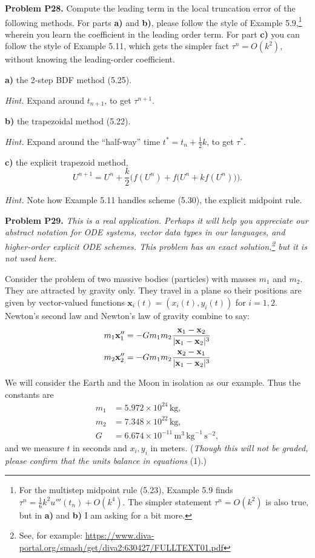 \documentclass[12pt]{amsart}
\newcommand{\bx}{\mathbf{x}}
\newcommand{\prob}[1]{\bigskip\noindent\textbf{#1}\quad }
\newcommand{\epart}[1]{\medskip\noindent\textbf{#1)}\quad }
\begin{document}
\prob{Problem P28.}  Compute the leading term in the local truncation error of the following methods.  For parts \textbf{a)} and \textbf{b)}, please follow the style of Example 5.9,\footnote{For the multistep midpoint rule (5.23), Example 5.9 finds $\tau^n = \frac{1}{6} k^2 u'''(t_n) + O(k^4)$.  The simpler statement $\tau^n=O(k^2)$ is also true, but in \textbf{a)} and \textbf{b)} I am asking for a bit more.} wherein you learn the coefficient in the leading order term.  For part \textbf{c)} you can follow the style of Example 5.11, which gets the simpler fact $\tau^n=O(k^2)$, without knowing the leading-order coefficient.

\epart{a} the 2-step BDF method (5.25).

\medskip
\noindent \emph{Hint.}  Expand around $t_{n+1}$, to get $\tau^{n+1}$.

\epart{b} the trapezoidal method (5.22).

\medskip
\noindent \emph{Hint.}  Expand around the ``half-way'' time $t^* = t_n+\frac{1}{2}k$, to get $\tau^*$.

\epart{c} the explicit trapezoid method,
    $$U^{n+1} = U^n + \frac{k}{2} \Big(f(U^n) + f\big(U^n + k f(U^n)\big)\Big).$$

\medskip
\noindent \emph{Hint.}  Note how Example 5.11 handles scheme (5.30), the explicit midpoint rule.


\prob{Problem P29.}  \emph{This is a real application.  Perhaps it will help you appreciate our abstract notation for ODE systems, vector data types in our languages, and higher-order explicit ODE schemes.  This problem has an exact solution,\footnote{See, for example: {\scriptsize\url{https://www.diva-portal.org/smash/get/diva2:630427/FULLTEXT01.pdf}}} but it is not used here.}

\medskip
Consider the problem of two massive bodies (particles) with masses $m_1$ and $m_2$.  They are attracted by gravity only.  They travel in a plane so their positions are given by vector-valued functions $\bx_i(t) = (x_i(t),y_i(t))$ for $i=1,2$.  Newton's second law and Newton's law of gravity combine to say:
\begin{align}
m_1 \bx_1'' &= - G m_1 m_2 \frac{\bx_1 - \bx_2}{|\bx_1 - \bx_2|^3} \label{twobody} \\
m_2 \bx_2'' &= - G m_1 m_2 \frac{\bx_2 - \bx_1}{|\bx_1 - \bx_2|^3} \notag
\end{align}

We will consider the Earth and the Moon in isolation as our example.  Thus the constants are
\begin{align*}
m_1 &= 5.972 \times 10^{24} \,\text{kg}, \\
m_2 &= 7.348 \times 10^{22} \,\text{kg}, \\
G &= 6.674 \times 10^{-11}\,\text{m}^3\,\text{kg}^{-1}\,\text{s}^{-2},
\end{align*}
and we measure $t$ in seconds and $x_i,y_i$ in meters.  (\emph{Though this will not be graded, please confirm that the units balance in equations} (1).)
\end{document}

